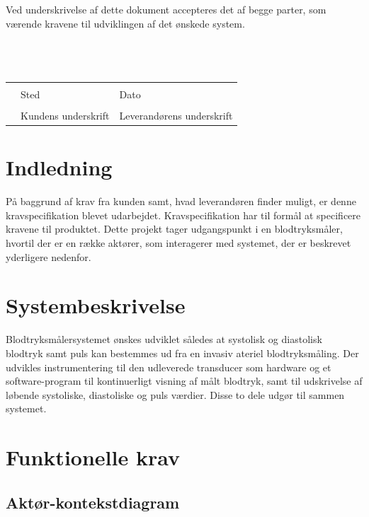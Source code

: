 Ved underskrivelse af dette dokument accepteres det af begge parter, som værende kravene til udviklingen af det ønskede system.
\\
\\
\\
\\
\noindent \begin{tabular}{lll} 
	& 	\makebox[2.5in]{\hrulefill} 	& 	\makebox[2.5in]{\hrulefill}\\
	&	Sted						&	Dato\\[7ex]
	& 	\makebox[2.5in]{\hrulefill} 	& 	\makebox[2.5in]{\hrulefill}\\
	& 	Kundens underskrift 		& 	Leverandørens underskrift\\[7ex]

\end{tabular}
\section{Indledning}
På baggrund af krav fra kunden samt, hvad leverandøren finder muligt, er denne kravspecifikation blevet udarbejdet. Kravspecifikation har til formål at specificere kravene til produktet. Dette projekt tager udgangspunkt i en blodtryksmåler, hvortil der er en række aktører, som interagerer med systemet, der er beskrevet yderligere nedenfor.

\section{Systembeskrivelse}
Blodtryksmålersystemet ønskes udviklet således at systolisk og diastolisk blodtryk samt puls kan bestemmes ud fra en invasiv ateriel blodtryksmåling. Der udvikles instrumentering til den udleverede transducer som hardware og et software-program til kontinuerligt visning af målt blodtryk, samt til udskrivelse af løbende systoliske, diastoliske og puls værdier. Disse to dele udgør til sammen systemet. 

\section{Funktionelle krav}
 

\subsection{Aktør-kontekstdiagram}


